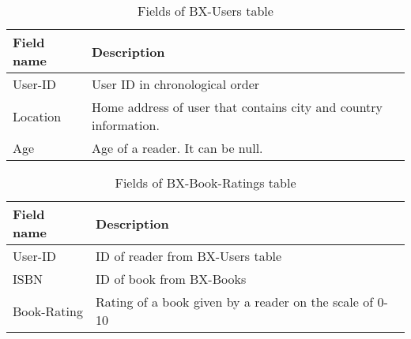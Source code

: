 \begin{table}[!htbp] 
\centering
\footnotesize
\def\arraystretch{1.4}%
\centering
\begin{tabular}{|p{2cm}|p{8cm}|}
\hline
Field name  & Description
\\
\hline
User-ID & User ID in chronological order
\\
\hline 
Location & Home address of user that contains city and country information.
\\
\hline
Age & Age of a reader. It can be null.
\\
\hline
\end{tabular}

\caption{Fields of BX-Users table}
\label{table:8}
\end{table}


\begin{table}[!htbp] 
\centering
\footnotesize
\def\arraystretch{1.4}%
\centering
\begin{tabular}{|p{2cm}|p{8cm}|}
\hline
Field name  & Description
\\
\hline
User-ID & ID of reader from BX-Users table
\\
\hline 
ISBN & ID of book from BX-Books
\\
\hline 
Book-Rating & Rating of a book given by a reader on the scale of 0-10
\\
\hline
\end{tabular}

\caption{Fields of  BX-Book-Ratings table}
\label{table:9}
\end{table}
\cite{N28}


